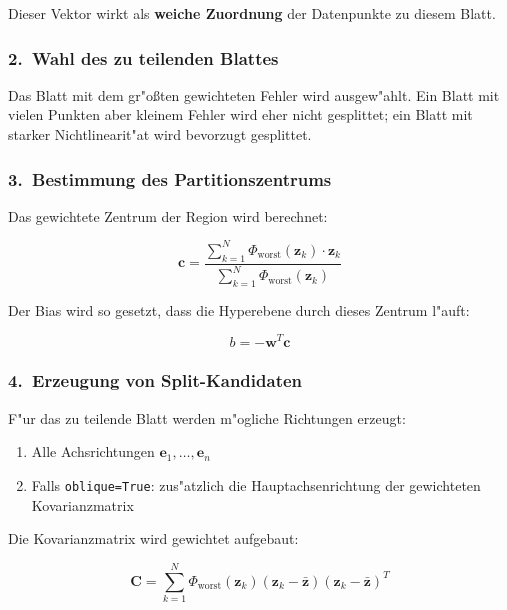 \documentclass[12pt,a4paper]{article}
\begin{document}
Dieser Vektor wirkt als \textbf{weiche Zuordnung} der Datenpunkte zu diesem Blatt.

\subsubsection*{2.~Wahl des zu teilenden Blattes}

Das Blatt mit dem gr"o\ss{}ten gewichteten Fehler wird ausgew"ahlt. Ein Blatt mit vielen Punkten aber kleinem Fehler wird eher nicht gesplittet; ein Blatt mit starker Nichtlinearit"at wird bevorzugt gesplittet.

\subsubsection*{3.~Bestimmung des Partitionszentrums}

Das gewichtete Zentrum der Region wird berechnet:

\begin{equation}
  \mathbf{c} = \frac{\sum_{k=1}^{N} \Phi_{\mathrm{worst}}(\mathbf{z}_k) \cdot \mathbf{z}_k}{\sum_{k=1}^{N} \Phi_{\mathrm{worst}}(\mathbf{z}_k)}
\end{equation}

Der Bias wird so gesetzt, dass die Hyperebene durch dieses Zentrum l"auft:

\begin{equation}
  b = -\mathbf{w}^T \mathbf{c}
\end{equation}

\subsubsection*{4.~Erzeugung von Split-Kandidaten}

F"ur das zu teilende Blatt werden m"ogliche Richtungen erzeugt:
\begin{enumerate}
  \item Alle Achsrichtungen $\mathbf{e}_1, \ldots, \mathbf{e}_n$
  \item Falls \texttt{oblique=True}: zus"atzlich die Hauptachsenrichtung der gewichteten Kovarianzmatrix
\end{enumerate}

Die Kovarianzmatrix wird gewichtet aufgebaut:

\begin{equation}
  \mathbf{C} = \sum_{k=1}^{N} \Phi_{\mathrm{worst}}(\mathbf{z}_k) (\mathbf{z}_k - \bar{\mathbf{z}})(\mathbf{z}_k - \bar{\mathbf{z}})^T
\end{equation}
\end{document}
